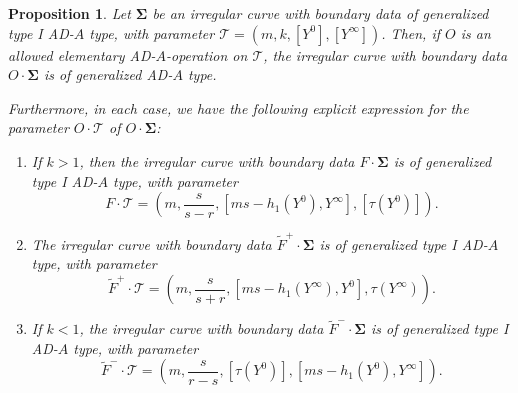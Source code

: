 \documentclass[10pt,a4paper]{amsart}
\newtheorem{proposition}{Proposition}
\begin{document}
\begin{proposition}
\label{prop:transformation_parameter_elementary_operation_type_I}
Let $\bm\Sigma$ be an irregular curve with boundary data of generalized type I AD-$A$ type, with parameter $\mathcal T=(m,k,[Y^0], [Y^\infty])$. Then, if $O$ is an allowed elementary AD-$A$-operation on $\mathcal T$, the irregular curve with boundary data $O\cdot \bm\Sigma$ is of generalized AD-$A$ type. 

Furthermore, in each case, we have the following explicit expression for the parameter $O\cdot \mathcal T$ of $O\cdot\bm\Sigma$:
\begin{enumerate}
\item If $k>1$, then the irregular curve with boundary data $F\cdot \bm\Sigma$ is  of generalized type I AD-$A$ type, with parameter
\begin{equation}
F\cdot \mathcal T=\left(m,\frac{s}{s-r},[ms-h_1(Y^0),Y^{\infty}], [\tau(Y^{0})]\right).
\end{equation}
\item The irregular curve with boundary data $\widetilde F^+\cdot \bm\Sigma$ is of generalized type I AD-$A$ type, with parameter
\begin{equation}
\widetilde F^+\cdot\mathcal T=\left(m,\frac{s}{s+r},[ms-h_1(Y^\infty),Y^{0}], \tau(Y^{\infty})\right).
\end{equation}
\item If $k<1$, the irregular curve with boundary data $\widetilde F^-\cdot \bm\Sigma$ is of  generalized type I AD-$A$ type, with parameter
\begin{equation}
\widetilde F^-\cdot\mathcal T=\left(m,\frac{s}{r-s},[\tau(Y^{0})], [ms-h_1(Y^0),Y^{\infty}]\right). 
\end{equation}
\end{enumerate}
\end{proposition}
\end{document}
